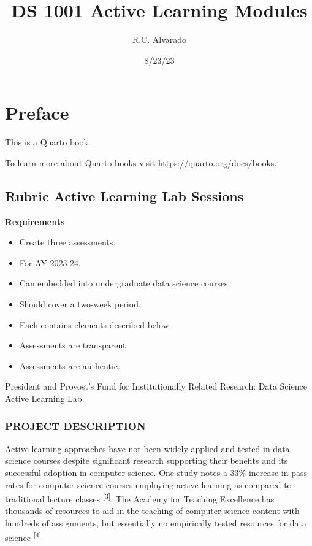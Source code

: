\documentclass[
  letterpaper,
  DIV=11,
  numbers=noendperiod]{scrreprt}
\title{DS 1001 Active Learning Modules}
\author{R.C. Alvarado}
\date{8/23/23}
\providecommand{\tightlist}{%
  \setlength{\itemsep}{0pt}\setlength{\parskip}{0pt}}\usepackage{longtable,booktabs,array}
\renewcommand*\contentsname{Table of contents}
\newcommand\contentsname{Table of contents}
\begin{document}
\maketitle
\ifdefined\Shaded\renewenvironment{Shaded}{\begin{tcolorbox}[interior hidden, borderline west={3pt}{0pt}{shadecolor}, sharp corners, boxrule=0pt, breakable, enhanced, frame hidden]}{\end{tcolorbox}}\fi

\renewcommand*\contentsname{Table of contents}
{
\hypersetup{linkcolor=}
\setcounter{tocdepth}{2}
\tableofcontents
}
\part{Preface}

This is a Quarto book.

To learn more about Quarto books visit
\url{https://quarto.org/docs/books}.

\hypertarget{rubric-active-learning-lab-sessions}{%
\chapter{Rubric Active Learning Lab
Sessions}\label{rubric-active-learning-lab-sessions}}

\textbf{Requirements}

\begin{itemize}
\tightlist
\item
  Create three assessments.
\item
  For AY 2023-24.
\item
  Can embedded into undergraduate data science courses.
\item
  Should cover a two-week period.
\item
  Each contains elements described below.
\item
  Assessments are transparent.
\item
  Assessments are authentic.
\end{itemize}

President and Provost's Fund for Institutionally Related Research: Data
Science Active Learning Lab.

\hypertarget{project-description}{%
\section{PROJECT DESCRIPTION}\label{project-description}}

Active learning approaches have not been widely applied and tested in
data science courses despite significant research supporting their
benefits and its successful adoption in computer science. One study
notes a 33\% increase in pass rates for computer science courses
employing active learning as compared to traditional lecture classes
\textsuperscript{{[}3{]}}. The Academy for Teaching Excellence has
thousands of resources to aid in the teaching of computer science
content with hundreds of assignments, but essentially no empirically
tested resources for data science \textsuperscript{{[}4{]}.}
\end{document}
